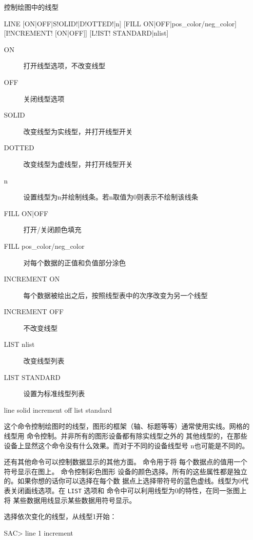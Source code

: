 \label{cmd:line}

控制绘图中的线型

\begin{SACSTX}
LINE [ON|OFF|S!OLID!|D!OTTED!|n] [FILL ON|OFF|pos_color/neg_color]
    [I!NCREMENT! [ON|OFF]] [L!IST! STANDARD|nlist]
\end{SACSTX}

\begin{description}
\item [ON] 打开线型选项，不改变线型
\item [OFF] 关闭线型选项
\item [SOLID] 改变线型为实线型，并打开线型开关
\item [DOTTED] 改变线型为虚线型，并打开线型开关
\item [n] 设置线型为n并绘制线条。若n取值为0则表示不绘制该线条
\item [FILL ON|OFF] 打开/关闭颜色填充
\item [FILL pos\_color/neg\_color] 对每个数据的正值和负值部分涂色
\item [INCREMENT ON] 每个数据被绘出之后，按照线型表中的次序改变为另一个线型
\item [INCREMENT OFF] 不改变线型
\item [LIST nlist] 改变线型列表
\item [LIST STANDARD] 设置为标准线型列表
\end{description}

\begin{SACDFT}
line solid increment off list standard
\end{SACDFT}

这个命令控制绘图时的线型，图形的框架（轴、标题等等）通常使用实线。网格的
线型用  命令控制。并非所有的图形设备都有除实线型之外的
其他线型的，在那些设备上显然这个命令没有什么效果。而对于不同的设备线型号
n也可能是不同的。

还有其他命令可以控制数据显示的其他方面。 命令用于将
每个数据点的值用一个符号显示在图上。 命令控制彩色图形
设备的颜色选择。所有的这些属性都是独立的。如果你想的话你可以选择在每个数
据点上选择带符号的蓝色虚线。线型为0代表关闭画线选项。在 \texttt{LIST}
选项和  命令中可以利用线型为0的特性，在同一张图上将
某些数据用线显示某些数据用符号显示。

选择依次变化的线型，从线型1开始：
\begin{SACCode}
SAC> line 1 increment
\end{SACCode}

